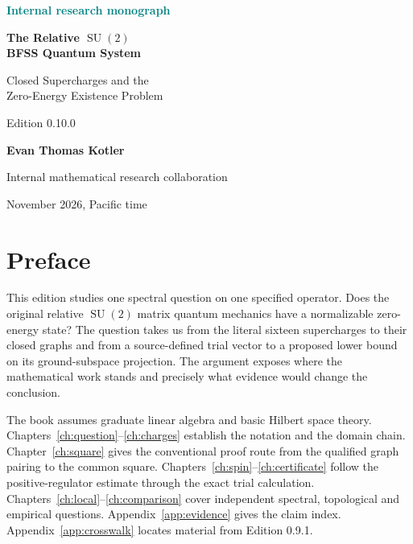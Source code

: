 \documentclass[11pt,oneside,openany]{book}
\theoremstyle{definition}
\newcommand{\SU}{\operatorname{SU}}
\begin{document}
\frontmatter
\begin{titlepage}
\thispagestyle{empty}
\noindent\textcolor{teal}{\large\bfseries Internal research monograph}\par
\vspace{1.25in}
\noindent{\color{teal}\rule{\textwidth}{1.1pt}}\par
\vspace{0.28in}
{\color{navy}\noindent\Huge\bfseries The Relative $\SU(2)$\\[0.15em] BFSS Quantum System\par}
\vspace{0.32in}
{\noindent\LARGE Closed Supercharges and the\\[0.12em] Zero-Energy Existence Problem\par}
\vfill
{\noindent\Large Edition 0.10.0\par}
\smallskip
{\noindent\large\bfseries Evan Thomas Kotler\par}
{\noindent Internal mathematical research collaboration\par}
{ November 2026, Pacific time\par}
\vspace{0.48in}
\end{titlepage}

\chapter*{Preface}
This edition studies one spectral question on one specified operator. Does the original relative $\SU(2)$ matrix quantum mechanics have a normalizable zero-energy state? The question takes us from the literal sixteen supercharges to their closed graphs and from a source-defined trial vector to a proposed lower bound on its ground-subspace projection. The argument exposes where the mathematical work stands and precisely what evidence would change the conclusion.

The book assumes graduate linear algebra and basic Hilbert space theory. Chapters~\ref{ch:question}--\ref{ch:charges} establish the notation and the domain chain. Chapter~\ref{ch:square} gives the conventional proof route from the qualified graph pairing to the common square. Chapters~\ref{ch:spin}--\ref{ch:certificate} follow the positive-regulator estimate through the exact trial calculation. Chapters~\ref{ch:local}--\ref{ch:comparison} cover independent spectral, topological and empirical questions. Appendix~\ref{app:evidence} gives the claim index. Appendix~\ref{app:crosswalk} locates material from Edition 0.9.1.
\end{document}

